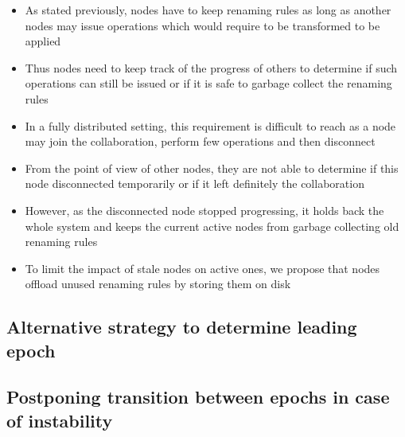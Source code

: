 \documentclass{article}
\begin{document}
\begin{itemize}
    \item As stated previously, nodes have to keep renaming rules as long as another nodes may issue operations which would require to be transformed to be applied
    \item Thus nodes need to keep track of the progress of others to determine if such operations can still be issued or if it is safe to garbage collect the renaming rules
    \item In a fully distributed setting, this requirement is difficult to reach as a node may join the collaboration, perform few operations and then disconnect
    \item From the point of view of other nodes, they are not able to determine if this node disconnected temporarily or if it left definitely the collaboration
    \item However, as the disconnected node stopped progressing, it holds back the whole system and keeps the current active nodes from garbage collecting old renaming rules
    \item To limit the impact of stale nodes on active ones, we propose that nodes offload unused renaming rules by storing them on disk
\end{itemize}


\subsection{Alternative strategy to determine leading epoch}
\subsection{Postponing transition between epochs in case of instability}
\end{document}
